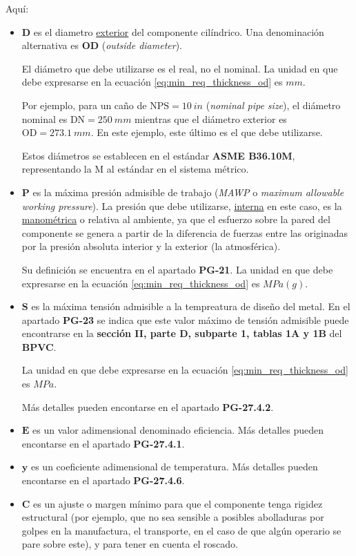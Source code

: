 Aquí:
\begin{itemize}
     \item $\mathbf{D}$ es el diametro \underline{exterior} del componente cilíndrico. Una denominación alternativa es $\mathbf{OD}$ (\textit{outside diameter}). 
     
     El diámetro que debe utilizarse es el real, no el nominal. La unidad en que debe expresarse en la ecuación \ref{eq:min_req_thickness_od} es $\si{mm}$.
     
     Por ejemplo, para un caño de $\text{NPS}=\SI{10}{in}$ (\textit{nominal pipe size}), el diámetro nominal es $\text{DN}=\SI{250}{mm}$ mientras que el diámetro exterior es $\text{OD}=\SI{273.1}{mm}$. En este ejemplo, este último es el que debe utilizarse.

     Estos diámetros se establecen en el estándar \textbf{ASME B36.10M}, representando la M al estándar en el sistema métrico.

     \item $\mathbf{P}$ es la máxima presión admisible de trabajo (\textit{MAWP} o \textit{maximum allowable working pressure}). La presión que debe utilizarse, \underline{interna} en este caso, es la \underline{manométrica} o relativa al ambiente, ya que el esfuerzo sobre la pared del componente se genera a partir de la diferencia de fuerzas entre las originadas por la presión absoluta interior y la exterior (la atmosférica).
     
     Su definición se encuentra en el apartado \textbf{PG-21}. La unidad en que debe expresarse en la ecuación \ref{eq:min_req_thickness_od} es $\si{MPa(g)}$.   

     \item $\mathbf{S}$ es la máxima tensión admisible a la tempreatura de diseño del metal. En el apartado \textbf{PG-23} se indica que este valor máximo de tensión admisible puede encontrarse en la \textbf{sección II, parte D, subparte 1, tablas 1A y 1B} del \textbf{BPVC}.
     
     La unidad en que debe expresarse en la ecuación \ref{eq:min_req_thickness_od} es $\si{MPa}$.

     Más detalles pueden encontarse en el apartado \textbf{PG-27.4.2}.

     \item $\mathbf{E}$ es un valor adimensional denominado eficiencia. Más detalles pueden encontarse en el apartado \textbf{PG-27.4.1}.
     \item $\mathbf{y}$ es un coeficiente adimensional de temperatura. Más detalles pueden encontarse en el apartado \textbf{PG-27.4.6}.
     \item $\mathbf{C}$ es un ajuste o margen mínimo para que el componente tenga rigidez estructural (por ejemplo, que no sea sensible a posibles abolladuras por golpes en la manufactura, el transporte, en el caso de que algún operario se pare sobre este), y para tener en cuenta el roscado.
     

\end{itemize}
